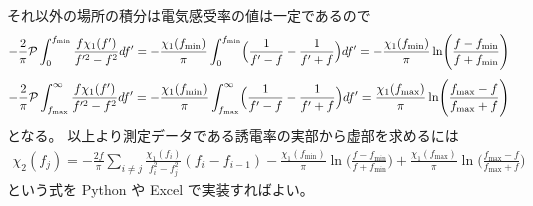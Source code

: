 \documentclass[9pt,dvipdfmx,a4paper]{jsarticle}
\begin{document}
それ以外の場所の積分は電気感受率の値は一定であるので
\begin{align}
    -\frac{2}{\pi}\mathcal{P}\int_{0}^{f_{\mathrm{min}}} \frac{f \chi_1(f')}{f'^2-f^2} df'
    = -\frac{\chi_1(f_{\mathrm{min}})}{\pi}\int_{0}^{f_{\mathrm{min}}} \Bigl(\frac{1}{f'-f}-\frac{1}{f'+f}\Bigl) df'
    = -\frac{\chi_1(f_{\mathrm{min}})}{\pi}\ln\Biggl(\frac{f-f_{\mathrm{min}}}{f+f_{\mathrm{min}}} \Biggr)
\end{align}
\begin{align}
    -\frac{2}{\pi}\mathcal{P}\int_{f_{\mathrm{max}}}^{\infty} \frac{f \chi_1(f')}{f'^2-f^2} df'
    = -\frac{\chi_1(f_{\mathrm{min}})}{\pi}\int_{f_{\mathrm{max}}}^{\infty} \Bigl(\frac{1}{f'-f}-\frac{1}{f'+f}\Bigl) df'
    =  \frac{\chi_1(f_{\mathrm{max}})}{\pi}\ln\Biggl(\frac{f_{\mathrm{max}}-f}{f_{\mathrm{max}}+f} \Biggr)
\end{align}
となる。
以上より測定データである誘電率の実部から虚部を求めるには
\begin{align}
    \chi_2(f_j) =
    - \frac{2f}{\pi}\sum_{i\neq j} \frac{\chi_1(f_i)}{f_i^2-f_j^2}(f_i-f_{i-1})
    - \frac{\chi_1(f_{\mathrm{min}})}{\pi}\ln\Biggl(\frac{f-f_{\mathrm{min}}}{f+f_{\mathrm{min}}} \Biggr)
    + \frac{\chi_1(f_{\mathrm{max}})}{\pi}\ln\Biggl(\frac{f_{\mathrm{max}}-f}{f_{\mathrm{max}}+f} \Biggr)
\end{align}
という式を Python や Excel で実装すればよい。
\end{document}
